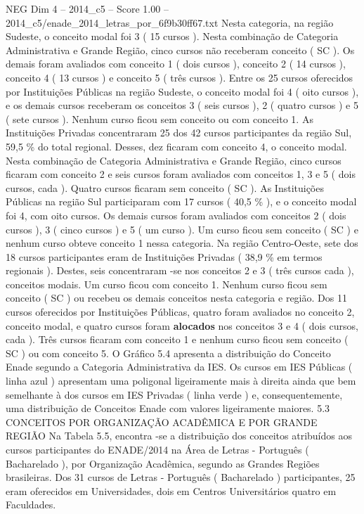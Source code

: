 \begin{textsample}{NEG Dim 4 – 2014\_c5 – Score 1.00 – 2014\_c5/enade\_2014\_letras\_por\_6f9b30ff67.txt}
Nesta categoria, na região Sudeste, o conceito modal foi 3 ( 15 cursos ).
Nesta combinação de Categoria Administrativa e Grande Região, cinco cursos não receberam conceito ( SC ).
Os demais foram avaliados com conceito 1 ( dois cursos ), conceito 2 ( 14 cursos ), conceito 4 ( 13 cursos ) e conceito 5 ( três cursos ).
Entre os 25 cursos oferecidos por Instituições Públicas na região Sudeste, o conceito modal foi 4 ( oito cursos ), e os demais cursos receberam os conceitos 3 ( seis cursos ), 2 ( quatro cursos ) e 5 ( sete cursos ).
Nenhum curso ficou sem conceito ou com conceito 1.
As Instituições Privadas concentraram 25 dos 42 cursos participantes da região Sul, 59,5 \% do total regional.
Desses, dez ficaram com conceito 4, o conceito modal.
Nesta combinação de Categoria Administrativa e Grande Região, cinco cursos ficaram com conceito 2 e seis cursos foram avaliados com conceitos 1, 3 e 5 ( dois cursos, cada ).
Quatro cursos ficaram sem conceito ( SC ).
As Instituições Públicas na região Sul participaram com 17 cursos ( 40,5 \% ), e o conceito modal foi 4, com oito cursos.
Os demais cursos foram avaliados com conceitos 2 ( dois cursos ), 3 ( cinco cursos ) e 5 ( um curso ).
Um curso ficou sem conceito ( SC ) e nenhum curso obteve conceito 1 nessa categoria.
Na região Centro-Oeste, sete dos 18 cursos participantes eram de Instituições Privadas ( 38,9 \% em termos regionais ).
Destes, seis concentraram -se nos conceitos 2 e 3 ( três cursos cada ), conceitos modais.
Um curso ficou com conceito 1.
Nenhum curso ficou sem conceito ( SC ) ou recebeu os demais conceitos nesta categoria e região.
Dos 11 cursos oferecidos por Instituições Públicas, quatro foram avaliados no conceito 2, conceito modal, e quatro cursos foram \textbf{alocados} nos conceitos 3 e 4 ( dois cursos, cada ).
Três cursos ficaram com conceito 1 e nenhum curso ficou sem conceito ( SC ) ou com conceito 5.
O Gráfico 5.4 apresenta a distribuição do Conceito Enade segundo a Categoria Administrativa da IES.
Os cursos em IES Públicas ( linha azul ) apresentam uma poligonal ligeiramente mais à direita ainda que bem semelhante à dos cursos em IES Privadas ( linha verde ) e, consequentemente, uma distribuição de Conceitos Enade com valores ligeiramente maiores. 5.3 CONCEITOS POR ORGANIZAÇÃO ACADÊMICA E POR GRANDE REGIÃO Na Tabela 5.5, encontra -se a distribuição dos conceitos atribuídos aos cursos participantes do ENADE/2014 na Área de Letras - Português ( Bacharelado ), por Organização Acadêmica, segundo as Grandes Regiões brasileiras.
Dos 31 cursos de Letras - Português ( Bacharelado ) participantes, 25 eram oferecidos em Universidades, dois em Centros Universitários quatro em Faculdades.

\end{textsample}
